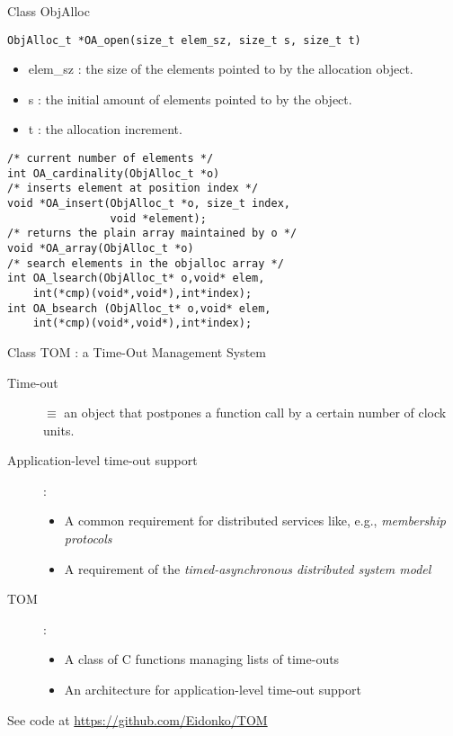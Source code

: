 \begin{frame}[fragile]{Class ObjAlloc}
\begin{small}
\begin{verbatim}
ObjAlloc_t *OA_open(size_t elem_sz, size_t s, size_t t)
\end{verbatim}
\end{small}
\begin{itemize}
\item elem\_sz : the size of the elements pointed to by the allocation object.
\item s : the initial amount of elements pointed to by the object.
\item t : the allocation increment.
\end{itemize}
\begin{small}
\begin{verbatim}
/* current number of elements */
int OA_cardinality(ObjAlloc_t *o)
/* inserts element at position index */
void *OA_insert(ObjAlloc_t *o, size_t index,
                void *element); 
/* returns the plain array maintained by o */
void *OA_array(ObjAlloc_t *o)
/* search elements in the objalloc array */
int OA_lsearch(ObjAlloc_t* o,void* elem,
    int(*cmp)(void*,void*),int*index);
int OA_bsearch (ObjAlloc_t* o,void* elem,
    int(*cmp)(void*,void*),int*index);
\end{verbatim}
\end{small}

\end{frame}
\begin{frame}[fragile]{Class TOM : a Time-Out Management System}
\begin{description}
\item[Time-out] $\equiv$ an object that postpones a function call
     by a certain number of clock units.
\item[Application-level time-out support]:
     \begin{itemize}
          \item A common requirement for distributed services like, e.g.,
	     \emph{membership protocols}
          \item A requirement of the
	     \emph{timed-asynchronous distributed system model}
     \end{itemize}
\item[TOM]:
     \begin{itemize}
          \item A class of C functions managing lists of time-outs
          \item An architecture for application-level time-out support
     \end{itemize}
\end{description}


\vspace{20pt}

See code at \url{https://github.com/Eidonko/TOM}


\end{frame}
